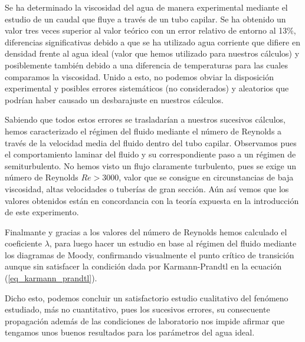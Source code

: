 Se ha determinado la viscosidad del agua de manera experimental mediante el estudio de un caudal que fluye a través de un tubo capilar. Se ha obtenido un valor tres veces superior al valor teórico con un error relativo de entorno al 13\%, diferencias significativas debido a que se ha utilizado agua corriente que difiere en densidad frente al agua ideal (valor que hemos utilizado para nuestros cálculos) y posiblemente también debido a una diferencia de temperaturas para las cuales comparamos la viscosidad. Unido a esto, no podemos obviar la disposición experimental y posibles errores sistemáticos (no considerados) y aleatorios que podrían haber causado un desbarajuste en nuestros cálculos.

Sabiendo que todos estos errores se trasladarían a nuestros sucesivos cálculos, hemos caracterizado el régimen del fluido mediante el número de Reynolds a través de la velocidad media del fluido dentro del tubo capilar. Observamos pues el comportamiento laminar del fluido y su correspondiente paso a un régimen de semiturbulento. No hemos visto un flujo claramente turbulento, pues se exige un número de Reynolds $Re>3000$, valor que se consigue en circunstancias de baja viscosidad, altas velocidades o tuberías de gran sección. Aún así vemos que los valores obtenidos están en concordancia con la teoría expuesta en la introducción de este experimento.

Finalmante y gracias a los valores del número de Reynolds hemos calculado el coeficiente $\lambda$, para luego hacer un estudio en base al régimen del fluido mediante los diagramas de Moody, confirmando visualmente el punto crítico de transición aunque sin satisfacer la condición dada por Karmann-Prandtl en la ecuación (\ref{eq_karmann_prandtl}).

Dicho esto, podemos concluir un satisfactorio estudio cualitativo del fenómeno estudiado, más no cuantitativo, pues los sucesivos errores, su consecuente propagación además de las condiciones de laboratorio nos impide afirmar que tengamos unos buenos resultados para los parámetros del agua ideal.